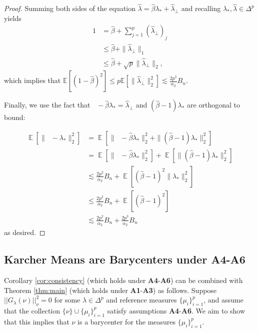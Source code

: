 \documentclass[nohyperref]{article}
\DeclareMathOperator*{\E}{\mathbb{E}}
\DeclareMathOperator*{\hatlambda}{\hat{\lambda}}
\theoremstyle{definition}
\begin{document}
\begin{proof}
Summing both sides of the equation $\hat{\lambda} = \hat{\beta} \lambda_*  + \hat{\lambda}_{\perp}$ and recalling $\lambda_{*}, \hat{\lambda}\in\Delta^{p}$ yields 
\begin{align*}1 &= \hat{\beta} +\sum_{j=1}^{p}(\hat{\lambda}_\perp)_{j}\\
&\le\hat{\beta}+\|\hat{\lambda}_\perp\|_{1}\\
&\le \hat{\beta}+\sqrt{p}\|\hat{\lambda}_\perp\|_{2},
\end{align*}
which implies that $\mathbb{E}[(1 - \hat{\beta})^2] \leq p \mathbb{E}[\| \hat{\lambda}_\perp\|_2^2] \lesssim \frac{2p^3}{\alpha_2} B_n$.

Finally, we use the fact that $\hatlambda-\hat{\beta}\lambda_{*}=\hat{\lambda}_{\perp}$ and $(\hat{\beta}-1)\lambda_{*}$ are orthogonal to bound: 

\begin{align*}
    \E[\|\hatlambda-\lambda_{*}\|_{2}^{2}] 
    &= \E[\|\hatlambda-\hat{\beta}\lambda_{*}\|_{2}^{2}+\|(\hat{\beta}-1)\lambda_{*}\|_{2}^{2}] \\
    &= \E[\|\hatlambda-\hat{\beta}\lambda_{*}\|_{2}^{2}] + \E[\|(\hat{\beta}-1)\lambda_{*}\|_{2}^{2}]\\
    &\lesssim \frac{2 p^{2}}{\alpha_{2}}B_{n}+\E[(\hat{\beta}-1)^{2}\|\lambda_{*}\|_{2}^{2}]\\
    &\le \frac{2 p^{2}}{\alpha_{2}}B_{n} + \E[(\hat{\beta}-1)^{2}]\\
    &\lesssim \frac{2 p^{2}}{\alpha_{2}}B_{n} + \frac{2p^3}{\alpha_2} B_n
\end{align*}as desired. 

\end{proof}

\subsection{Karcher Means are Barycenters under \textbf{A4}-\textbf{A6}}

Corollary \ref{cor:consistency} (which holds under \textbf{A4}-\textbf{A6}) can be combined with Theorem \ref{thm:main} (which holds under \textbf{A1}-\textbf{A3}) as follows.  Suppose $||G_{\lambda}(\nu)||_{\nu}^2 = 0$ for some $\lambda \in \Delta^p$ and reference measures $\{\mu_i\}_{i=1}^{p}$, and assume that the collection $\{\nu\} \cup \{\mu_i\}_{i=1}^p$ satisfy assumptions \textbf{A4}-\textbf{A6}. We aim to show that this implies that $\nu$ is a barycenter for the measures $\{\mu_{i}\}_{i=1}^{p}$.
\end{document}
